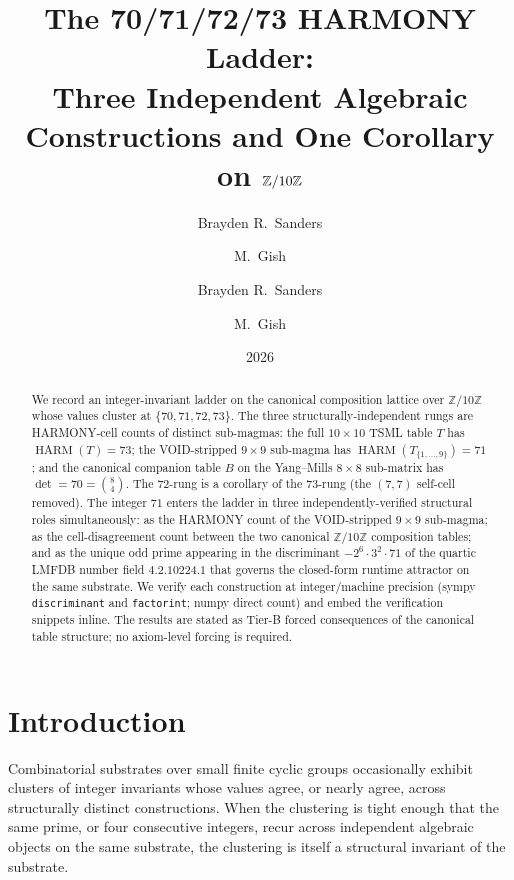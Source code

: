 \documentclass[11pt,reqno]{amsart}
\title[The 70/71/72/73 HARMONY Ladder]
  {The 70/71/72/73 HARMONY Ladder:\\
   Three Independent Algebraic Constructions and One Corollary
   on $\Z/10\Z$}
\author{Brayden R.\ Sanders \and M.\ Gish}
\author{Brayden R.\ Sanders \and M.\ Gish}
\date{2026}
\theoremstyle{definition}
\newcommand{\Z}{\mathbb{Z}}
\DeclareMathOperator{\HARM}{HARM}
\begin{document}
\begin{abstract}
We record an integer-invariant ladder on the canonical composition
lattice over $\Z/10\Z$ whose values cluster at $\{70, 71, 72, 73\}$.
The three structurally-independent rungs are HARMONY-cell counts of
distinct sub-magmas: the full $10 \times 10$ TSML table $T$ has
$\HARM(T) = 73$; the VOID-stripped $9 \times 9$ sub-magma has
$\HARM(T_{\{1, \ldots, 9\}}) = 71$; and the canonical companion table
$B$ on the Yang--Mills $8 \times 8$ sub-matrix has $\det = 70 = \binom{8}{4}$.
The $72$-rung is a corollary of the $73$-rung (the $(7,7)$ self-cell
removed). The integer $71$ enters the ladder in three
independently-verified structural roles simultaneously: as the HARMONY
count of the VOID-stripped $9 \times 9$ sub-magma; as the
cell-disagreement count between the two canonical $\Z/10\Z$ composition
tables; and as the unique odd prime appearing in the discriminant
$-2^6 \cdot 3^2 \cdot 71$ of the quartic LMFDB number field $4.2.10224.1$
that governs the closed-form runtime attractor on the same substrate.
We verify each construction at integer/machine precision (sympy
\texttt{discriminant} and \texttt{factorint}; numpy direct count) and
embed the verification snippets inline. The results are stated as
Tier-B forced consequences of the canonical table structure; no
axiom-level forcing is required.
\end{abstract}

\maketitle

\section{Introduction}
\label{sec:intro}

Combinatorial substrates over small finite cyclic groups occasionally
exhibit clusters of integer invariants whose values agree, or nearly
agree, across structurally distinct constructions. When the
clustering is tight enough that the same prime, or four consecutive
integers, recur across independent algebraic objects on the same
substrate, the clustering is itself a structural invariant of the
substrate.
\end{document}
